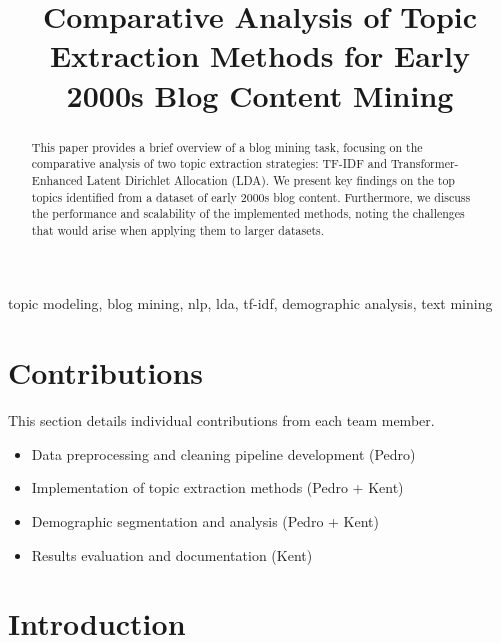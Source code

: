 \documentclass[conference]{IEEEtran}
\begin{document}
\title{Comparative Analysis of Topic Extraction Methods for Early 2000s Blog Content Mining}

\author{
\and
{}
}

\maketitle

\begin{abstract}
This paper provides a brief overview of a blog mining task, focusing on the comparative analysis of two topic extraction strategies: TF-IDF and Transformer-Enhanced Latent Dirichlet Allocation (LDA). We present key findings on the top topics identified from a dataset of early 2000s blog content. Furthermore, we discuss the performance and scalability of the implemented methods, noting the challenges that would arise when applying them to larger datasets.
\end{abstract}

\begin{IEEEkeywords}
topic modeling, blog mining, nlp, lda, tf-idf, demographic analysis, text mining
\end{IEEEkeywords}

\section{Contributions}
This section details individual contributions from each team member.
\begin{itemize}
    \item Data preprocessing and cleaning pipeline development (Pedro)
    \item Implementation of topic extraction methods (Pedro + Kent)
    \item Demographic segmentation and analysis (Pedro + Kent)
    \item Results evaluation and documentation (Kent)
\end{itemize}

\section{Introduction}
\end{document}
